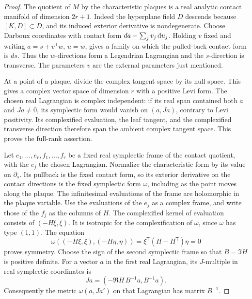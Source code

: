 \begin{proof}
The quotient of $M$ by the characteristic plaques is a real analytic contact manifold of dimension $2r+1$.  Indeed the hyperplane field $D$ descends because $[K,D]\subset D$, and its induced exterior derivative is nondegenerate.  Choose Darboux coordinates with contact form $da-\sum_j v_j\,\mathrm{d} u_j$.  Holding $v$ fixed and writing $a=s+v^{\mathsf T}w$, $u=w$, gives a family on which the pulled-back contact form is $ds$.  Thus the $w$-directions form a Legendrian Lagrangian and the $s$-direction is transverse.  The parameters $v$ are the external parameters just mentioned.

At a point of a plaque, divide the complex tangent space by its null space.  This gives a complex vector space of dimension $r$ with a positive Levi form.  The chosen real Lagrangian is complex independent: if its real span contained both $a$ and $Ja\ne0$, its symplectic form would vanish on $(a,Ja)$, contrary to Levi positivity.  Its complexified evaluation, the leaf tangent, and the complexified transverse direction therefore span the ambient complex tangent space.  This proves the full-rank assertion.

Let $e_1,\ldots,e_r,f_1,\ldots,f_r$ be a fixed real symplectic frame of the contact quotient, with the $e_j$ the chosen Lagrangian.  Normalize the characteristic form by its value on $\partial_s$.  Its pullback is the fixed contact form, so its exterior derivative on the contact directions is the fixed symplectic form $\omega$, including as the point moves along the plaque.  The infinitesimal evaluations of the frame are holomorphic in the plaque variable.  Use the evaluations of the $e_j$ as a complex frame, and write those of the $f_j$ as the columns of $H$. The complexified kernel of evaluation consists of $(-H\xi,\xi)$. It is isotropic for the complexification of $\omega$, since $\omega$ has type $(1,1)$.  The equation
\[
 \omega((-H\xi,\xi),(-H\eta,\eta))
                =\xi^{\mathsf T}(H-H^{\mathsf T})\eta=0
\]
proves symmetry.  Choose the sign of the second symplectic frame so that $B=\Im H$ is positive definite.  For a vector $a$ in the first real Lagrangian, its $J$-multiple in real symplectic coordinates is
\[
                  Ja=(-\Re H\,B^{-1}a,B^{-1}a).
\]
Consequently the metric $\omega(a,Ja')$ on that Lagrangian has matrix $B^{-1}$.


\end{proof}

